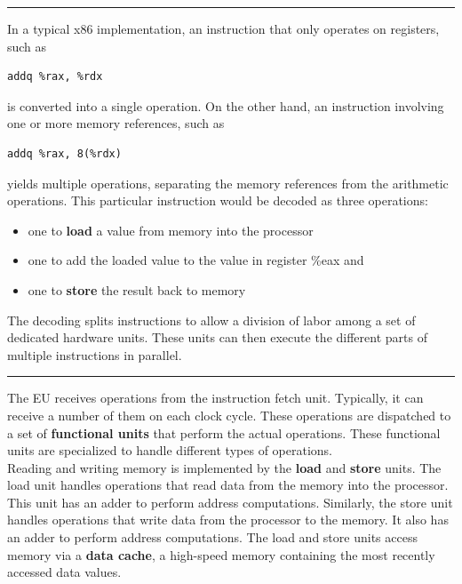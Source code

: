 \documentclass[11pt]{article}
\begin{document}
\noindent\rule{\textwidth}{0.5pt}
In a typical x86 implementation, an instruction that only operates on registers, such as\\
\begin{verbatim}
addq %rax, %rdx
\end{verbatim}
is converted into a single operation. On the other hand, an instruction involving one or more memory references, such as\\
\begin{verbatim}
addq %rax, 8(%rdx)
\end{verbatim}
yields multiple operations, separating the memory references from the arithmetic operations. This particular instruction would be decoded as three operations:\\
\begin{itemize}
\item one to \textbf{load} a value from memory into the processor\\
\item one to add the loaded value to the value in register \%eax and\\
\item one to \textbf{store} the result back to memory\\
\end{itemize}

The decoding splits instructions to allow a division of labor among a set of dedicated hardware units. These units can then execute the different parts of multiple instructions in parallel.\\

\noindent\rule{\textwidth}{0.5pt}

The EU receives operations from the instruction fetch unit. Typically, it can receive a number of them on each clock cycle. These operations are dispatched to a set of \textbf{functional units} that perform the actual operations. These functional units are specialized to handle different types of operations.\\

Reading and writing memory is implemented by the \textbf{load} and \textbf{store} units. The load unit handles operations that read data from the memory into the processor. This unit has an adder to perform address computations. Similarly, the store unit handles operations that write data from the processor to the memory. It also has an adder to perform address computations. The load and store units access memory via a \textbf{data cache}, a high-speed memory containing the most recently accessed data values.\\
\end{document}
